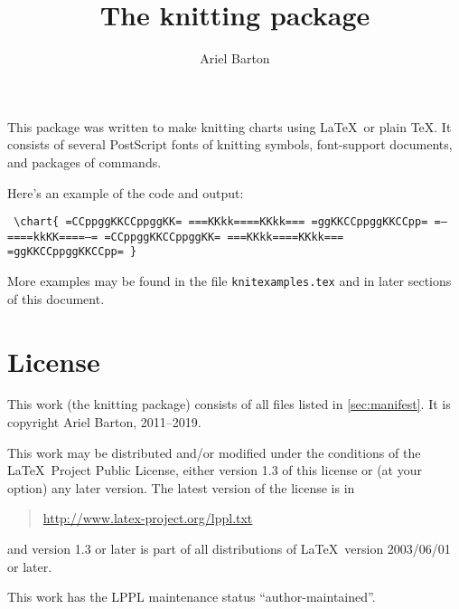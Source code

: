\documentclass[draft]{amsart}
\title{The \textsf{knitting} package}
\author{Ariel Barton}
\begin{document}
\maketitle

\tableofcontents



This package was written to make knitting charts using \LaTeX\ or plain
\TeX. It consists of several PostScript fonts of knitting symbols,
font-support documents, and packages of commands.

Here's an example of the code and output:
\begin{center}
\begin{minipage}[b]{108pt}
\obeylines\parindent=0pt\tt
\verb|\chart{|
=CCppggKKCCppggKK=
===KKkk====KKkk===
=ggKKCCppggKKCCpp=
=--====kkKK====--=
=CCppggKKCCppggKK=
===KKkk====KKkk===
=ggKKCCppggKKCCpp=
\verb|}|
\end{minipage}
\quad
\begin{minipage}[t]{220pt}

\end{minipage}
\end{center}

More examples may be found in the file \texttt{knitexamples.tex} and in
later sections of this document.

\section{License}

This work (the \textsf{knitting} package) consists of all files listed
in \autoref{sec:manifest}. It is copyright Ariel Barton, 2011--2019.

This work may be distributed and/or modified under the
conditions of the \LaTeX\ Project Public License, either
version 1.3 of this license or (at your option) any
later version.
The latest version of the license is in
\begin{quote}
\href {http://www.latex-project.org/lppl.txt}
{http://www.latex-project.org/lppl.txt}
\end{quote}
and version 1.3 or later is part of all distributions of
\LaTeX\ version 2003/06/01 or later.

This work has the LPPL maintenance status ``author-maintained''.
\end{document}

